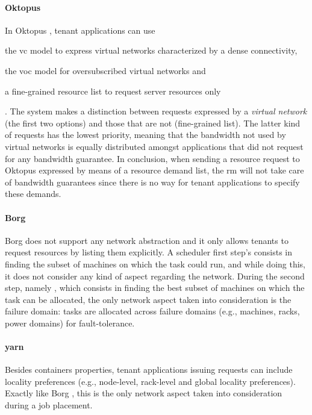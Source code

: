 \paragraph{Oktopus \texorpdfstring{\cite{oktopus}}{}}
In Oktopus \cite{oktopus}, tenant applications can use
\begin{mylist}
    \item the \gls{vc} model to express virtual networks characterized by a dense connectivity,
    \item the \gls{voc} model for oversubscribed virtual networks and
    \item a fine-grained resource list to request server resources only
\end{mylist}.
The system makes a distinction between requests expressed by a \textit{virtual network} (the first two options) and those that are not (fine-grained list).
The latter kind of requests has the lowest priority, meaning that the bandwidth not used by virtual networks is equally distributed amongst applications that did not request for any bandwidth guarantee.
In conclusion, when sending a resource request to Oktopus \cite{oktopus} expressed by means of a resource demand list, the \gls{rm} will not take care of bandwidth guarantees since there is no way for tenant applications to specify these demands.

\paragraph{Borg \texorpdfstring{\cite{borg}}{}}
Borg \cite{borg} does not support any network abstraction and it only allows tenants to request resources by listing them explicitly.
A scheduler first step's consists in finding the subset of machines on which the task could run, and while doing this, it does not consider any kind of aspect regarding the network.
During the second step, namely , which consists in finding the best subset of machines on which the task can be allocated, the only network aspect taken into consideration is the failure domain: tasks are allocated across failure domains (e.g., machines, racks, power domains) for fault-tolerance.



\paragraph{\glsdesc{yarn}}
Besides containers properties, tenant applications issuing requests can include locality preferences (e.g., node-level, rack-level and global locality preferences).
Exactly like Borg \cite{borg}, this is the only network aspect taken into consideration during a job placement.